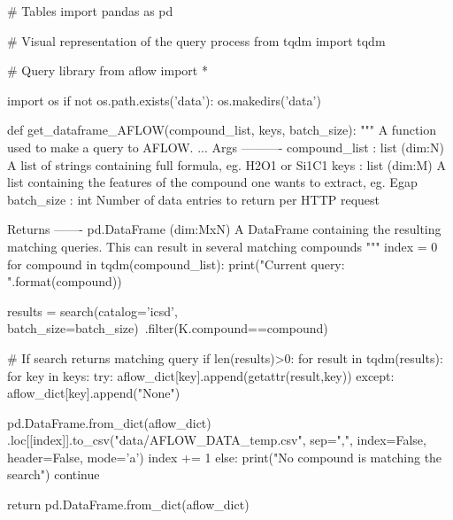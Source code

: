 # Tables
import pandas as pd

# Visual representation of the query process
from tqdm import tqdm

# Query library
from aflow import *

import os
if not os.path.exists('data'):
    os.makedirs('data')

def get_dataframe_AFLOW(compound_list, keys, batch_size):
    """
    A function used to make a query to AFLOW.
    ...
    Args
    ----------
    compound_list : list (dim:N)
        A list of strings containing full formula, eg. H2O1 or Si1C1
    keys : list (dim:M)
        A list containing the features of the compound one wants to extract,
        eg. Egap
    batch_size : int
        Number of data entries to return per HTTP request

    Returns
    -------
    pd.DataFrame (dim:MxN)
        A DataFrame containing the resulting matching queries. This can result
        in several matching compounds
    """
    index = 0
    for compound in tqdm(compound_list):
        print("Current query: {}".format(compound))

        results = search(catalog='icsd', batch_size=batch_size)\
            .filter(K.compound==compound)

        # If search returns matching query
        if len(results)>0:
            for result in tqdm(results):
                for key in keys:
                    try:
                        aflow_dict[key].append(getattr(result,key))
                    except:
                        aflow_dict[key].append("None")

                pd.DataFrame.from_dict(aflow_dict)
                  .loc[[index]].to_csv("data/AFLOW_DATA_temp.csv",
                sep=",",
                index=False,
                header=False,
                mode='a')
                index += 1
        else:
            print("No compound is matching the search")
            continue

    return pd.DataFrame.from_dict(aflow_dict)
